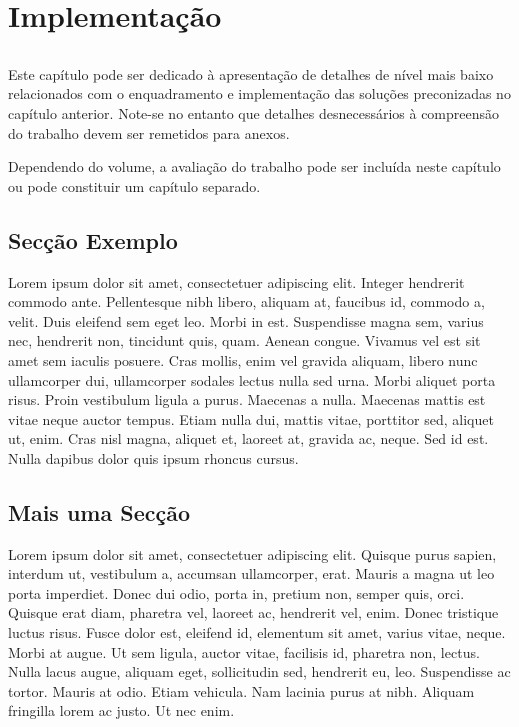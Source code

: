 \chapter{Implementação}\label{chap:chap4}

\section*{}

Este capítulo pode ser dedicado à apresentação de detalhes de nível
mais baixo relacionados com o enquadramento e implementação das
soluções preconizadas no capítulo anterior.
Note-se no entanto que detalhes desnecessários à compreensão do
trabalho devem ser remetidos para anexos.

Dependendo do volume, a avaliação do trabalho pode ser incluída neste
capítulo ou pode constituir um capítulo separado.

\section{Secção Exemplo}


Lorem ipsum dolor sit amet, consectetuer adipiscing elit. Integer
hendrerit commodo ante. Pellentesque nibh libero, aliquam at, faucibus
id, commodo a, velit. 
Duis eleifend sem eget leo. Morbi in est. Suspendisse magna sem,
varius nec, hendrerit non, tincidunt quis, quam. Aenean congue. 
Vivamus vel est sit amet sem iaculis posuere. Cras mollis, enim vel
gravida aliquam, libero nunc ullamcorper dui, ullamcorper sodales
lectus nulla sed urna. Morbi aliquet porta risus. 
Proin vestibulum ligula a purus. Maecenas a nulla. 
Maecenas mattis est vitae neque auctor tempus. Etiam nulla dui,
mattis vitae, porttitor sed, aliquet ut, enim. Cras nisl magna,
aliquet et, laoreet at, gravida ac, neque. Sed id est. Nulla dapibus
dolor quis ipsum rhoncus cursus. 

\section{Mais uma Secção}

Lorem ipsum dolor sit amet, consectetuer adipiscing elit. Quisque
purus sapien, interdum ut, vestibulum a, accumsan ullamcorper,
erat. Mauris a magna ut leo porta imperdiet. Donec dui odio, porta in,
pretium non, semper quis, orci. Quisque erat diam, pharetra vel,
laoreet ac, hendrerit vel, enim. Donec tristique luctus risus. Fusce
dolor est, eleifend id, elementum sit amet, varius vitae, neque. Morbi
at augue. Ut sem ligula, auctor vitae, facilisis id, pharetra non,
lectus. Nulla lacus augue, aliquam eget, sollicitudin sed, hendrerit
eu, leo. Suspendisse ac tortor. Mauris at odio. Etiam vehicula. Nam
lacinia purus at nibh. Aliquam fringilla lorem ac justo. Ut nec
enim. 

